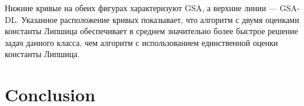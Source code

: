 \documentclass[runningheads]{llncs}
\begin{document}
Нижние кривые на обеих фигурах характеризуют GSA, а верхние линии — GSA-DL. Указанное расположение кривых показывает, что алгоритм с двумя оценками константы Липшица обеспечивает в среднем значительно более быстрое решение задач данного класса, чем алгоритм с использованием единственной оценки константы Липшица.






\section{Conclusion}


%
%




\end{document}
